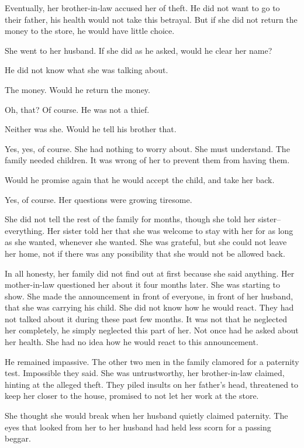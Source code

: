 \documentclass{article}
\begin{document}
Eventually, her brother-in-law accused her of theft. He did not want to go to their father, his health would not take this betrayal. But if she did not return the money to the store, he would have little choice. 

She went to her husband. If she did as he asked, would he clear her name?

He did not know what she was talking about.

The money. Would he return the money. 

Oh, that? Of course. He was not a thief.

Neither was she. Would he tell his brother that.

Yes, yes, of course. She had nothing to worry about. She must understand. The family needed children. It was wrong of her to prevent them from having them.

Would he promise again that he would accept the child, and take her back.

Yes, of course. Her questions were growing tiresome.

\vspace{.5 cm}

She did not tell the rest of the family for months, though she told her sister-- everything. Her sister told her that she was welcome to stay with her for as long as she wanted, whenever she wanted. She was grateful, but she could not leave her home, not if there was any possibility that she would not be allowed back.

In all honesty, her family did not find out at first because she said anything. Her mother-in-law questioned her about it four months later. She was starting to show. She made the announcement in front of everyone, in front of her husband, that she was carrying his child. She did not know how he would react. They had not talked about it during these past few months. It was not that he neglected her completely, he simply neglected this part of her. Not once had he asked about her health. She had no idea how he would react to this announcement. 

He remained impassive. The other two men in the family clamored for a paternity test. Impossible they said. She was untrustworthy, her brother-in-law claimed, hinting at the alleged theft. They piled insults on her father's head, threatened to keep her closer to the house, promised to not let her work at the store.

She thought she would break when her husband quietly claimed paternity. The eyes that looked from her to her husband had held less scorn for a passing beggar. 
\end{document}
